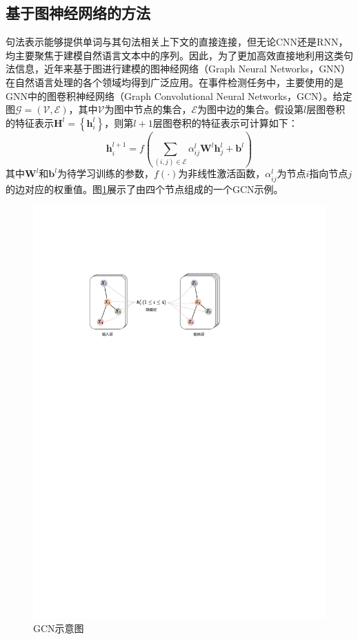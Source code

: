 \subsection{基于图神经网络的方法}

句法表示能够提供单词与其句法相关上下文的直接连接，但无论CNN还是RNN，均主要聚焦于建模自然语言文本中的序列。因此，为了更加高效直接地利用这类句法信息，近年来基于图进行建模的图神经网络（Graph Neural Networks，GNN）在自然语言处理的各个领域均得到广泛应用。在事件检测任务中，主要使用的是GNN中的图卷积神经网络（Graph Convolutional Neural Networks，GCN）\cite{kipf2016semi}。给定图$\mathcal{G}=(\mathcal{V}, \mathcal{E})$，其中$\mathcal{V}$为图中节点的集合，$\mathcal{E}$为图中边的集合。假设第$l$层图卷积的特征表示$\boldsymbol{H}^l=\left\{\boldsymbol{h}_i^l\right\}$，则第$l+1$层图卷积的特征表示可计算如下：
\begin{equation}
    \boldsymbol{h}_i^{l+1}=f(\sum_{(i, j) \in \mathcal{E}} \alpha_{i j}^l \boldsymbol{W}^l \boldsymbol{h}_j^l+\boldsymbol{b}^l)
\end{equation}
其中$\boldsymbol{W}^l$和$\boldsymbol{b}^l$为待学习训练的参数，$f(\cdot)$为非线性激活函数，$\alpha_{i j}^l$为节点$i$指向节点$j$的边对应的权重值。图\ref{gcn}展示了由四个节点组成的一个GCN示例。

\begin{figure}[htp]
   \centering
   \includegraphics[width=0.7\linewidth]{figures/chap2/gcn.pdf}
   \caption{GCN示意图}
   \label{gcn}
\end{figure}

